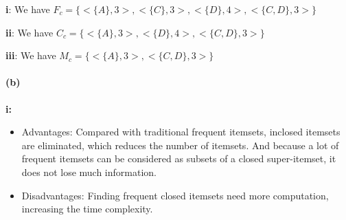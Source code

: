 \documentclass[en,black,normal,10pt]{elegantnote}
\begin{document}

\textbf{i}: We have $F_c = \{ <\{A\},3>, <\{C\},3>, <\{D\},4>, <\{C, D\},3>\}$

\textbf{ii}: We have $C_c = \{ <\{A\},3>, <\{D\},4>, <\{C, D\},3>\}$

\textbf{iii}: We have $M_c = \{ <\{A\},3>, <\{C, D\},3>\}$

\paragraph*{(b)} \textbf{i:}

\begin{itemize}
  \item Advantages: Compared with traditional frequent itemsets, inclosed itemsets are eliminated, which reduces the number of itemsets. And because a lot of frequent itemsets can be considered as subsets of a closed super-itemset, it does not lose much information.
  \item Disadvantages: Finding frequent closed itemsets need more computation, increasing the time complexity.
\end{itemize}
\end{document}
